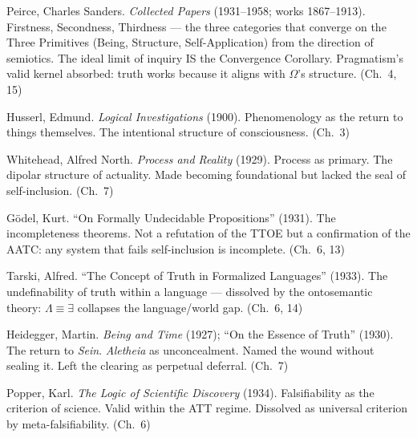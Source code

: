 \documentclass[10pt, openany, oneside]{book}
\begin{document}
{\vspace{0.3em}

\noindent Peirce, Charles Sanders. \textit{Collected Papers} (1931--1958; works 1867--1913). Firstness, Secondness, Thirdness --- the three categories that converge on the Three Primitives (Being, Structure, Self-Application) from the direction of semiotics. The ideal limit of inquiry IS the Convergence Corollary. Pragmatism's valid kernel absorbed: truth works because it aligns with $\Omega$'s structure. (Ch.\ 4, 15)

\vspace{0.3em}

\noindent Husserl, Edmund. \textit{Logical Investigations} (1900). Phenomenology as the return to things themselves. The intentional structure of consciousness. (Ch.\ 3)

\vspace{0.3em}

\noindent Whitehead, Alfred North. \textit{Process and Reality} (1929). Process as primary. The dipolar structure of actuality. Made becoming foundational but lacked the seal of self-inclusion. (Ch.\ 7)

\vspace{0.3em}

\noindent G\"{o}del, Kurt. ``On Formally Undecidable Propositions'' (1931). The incompleteness theorems. Not a refutation of the TTOE but a confirmation of the AATC: any system that fails self-inclusion is incomplete. (Ch.\ 6, 13)

\vspace{0.3em}

\noindent Tarski, Alfred. ``The Concept of Truth in Formalized Languages'' (1933). The undefinability of truth within a language --- dissolved by the ontosemantic theory: $\Lambda \equiv \exists$ collapses the language/world gap. (Ch.\ 6, 14)

\vspace{0.3em}

\noindent Heidegger, Martin. \textit{Being and Time} (1927); ``On the Essence of Truth'' (1930). The return to \textit{Sein}. \textit{Aletheia} as unconcealment. Named the wound without sealing it. Left the clearing as perpetual deferral. (Ch.\ 7)

\vspace{0.3em}

\noindent Popper, Karl. \textit{The Logic of Scientific Discovery} (1934). Falsifiability as the criterion of science. Valid within the ATT regime. Dissolved as universal criterion by meta-falsifiability. (Ch.\ 6)

}
\end{document}
